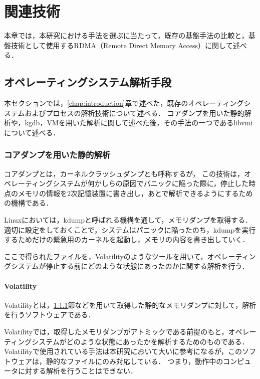 \chapter{関連技術}
\label{chap:related_works}

本章では，本研究における手法を選ぶに当たって，既存の基盤手法の比較と，基盤技術として使用するRDMA（Remote Direct Memory Access）に関して述べる．

\section{オペレーティングシステム解析手段}

本セクションでは，\ref{chap:introduction}章で述べた，既存のオペレーティングシステムおよびプロセスの解析技術について述べる．
コアダンプを用いた静的解析や，kgdb，VMを用いた解析に関して述べた後，その手法の一つであるlibvmiについて述べる．

\subsection{コアダンプを用いた静的解析}
\label{subsubsection:core_dump}

コアダンプとは，カーネルクラッシュダンプとも呼称する\cite{dump}が，
この技術は，オペレーティングシステムが何かしらの原因でパニックに陥った際に，停止した時点のメモリの情報を2次記憶装置に書き出し，あとで解析できるようにするための機構である．

Linuxにおいては，kdumpと呼ばれる機構を通して，メモリダンプを取得する．
適切に設定をしておくことで，システムはパニックに陥ったのち，kdumpを実行するためだけの緊急用のカーネルを起動し，メモリの内容を書き出していく．

ここで得られたファイルを，Volatility\cite{Volatility}のようなツールを用いて，オペレーティングシステムが停止する前にどのような状態にあったのかに関する解析を行う．

\subsubsection{Volatility}
\label{subsubsection:Volatility}

Volatility\cite{Volatility}とは，\ref{subsubsection:core_dump}節などを用いて取得した静的なメモリダンプに対して，解析を行うソフトウェアである．

Volatilityでは，取得したメモリダンプがアトミックである前提のもと，オペレーティングシステムがどのような状態にあったかを解析するためのものである．
Volatilityで使用されている手法は本研究において大いに参考になるが，このソフトウェアは，静的なファイルにのみ対応している．
つまり，動作中のコンピュータに対する解析を行うことはできない．

